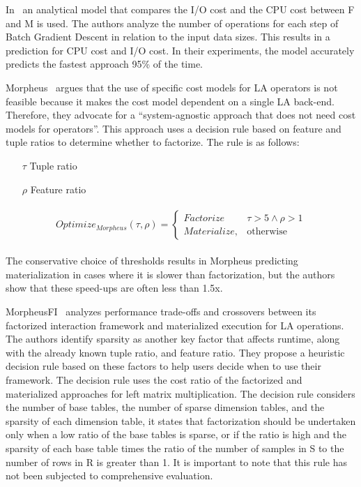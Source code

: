 In~\cite{orion_learning_gen_lin_models} an analytical model that compares the I/O cost and the CPU cost between F and M is used. The authors analyze the number of operations for each step of Batch Gradient Descent in relation to the input data sizes. This results in a prediction for CPU cost and I/O cost. In their experiments, the model accurately predicts the fastest approach 95\% of the time.

Morpheus~\cite{morpheus} argues that the use of specific cost models for LA operators is not feasible because it makes the cost model dependent on a single LA back-end. Therefore, they advocate for a “system-agnostic approach that does not need cost models for operators”. This approach uses a decision rule based on feature and tuple ratios to determine whether to factorize. The rule is as follows:

\begin{definition}
  \begin{itemize}
    \item[]
    \item[$\tau$] Tuple ratio
    \item[$\rho$] Feature ratio
  \end{itemize}

  \begin{align*}
    \begin{split}
      Optimize_{Morpheus}(\tau, \rho) =
      \begin{cases}
        Factorize    & \tau > 5 \wedge \rho > 1 \\
        Materialize, & \text{otherwise}
      \end{cases}
    \end{split}
  \end{align*}
\end{definition}

The conservative choice of thresholds results in Morpheus predicting materialization in cases where it is slower than factorization, but the authors show that these speed-ups are often less than 1.5x.

MorpheusFI~\cite{MorpheusFI} analyzes performance trade-offs and crossovers between its factorized interaction framework and materialized execution for LA operations. The authors identify sparsity as another key factor that affects runtime, along with the already known tuple ratio, and feature ratio. They propose a heuristic decision rule based on these factors to help users decide when to use their framework. The decision rule uses the cost ratio of the factorized and materialized approaches for left matrix multiplication. The decision rule considers the number of base tables, the number of sparse dimension tables, and the sparsity of each dimension table, it states that factorization should be undertaken only when a low ratio of the base tables is sparse, or if the ratio is high and the sparsity of each base table times the ratio of the number of samples in S to the number of rows in R is greater than 1.  It is important to note that this rule has not been subjected to comprehensive evaluation.


